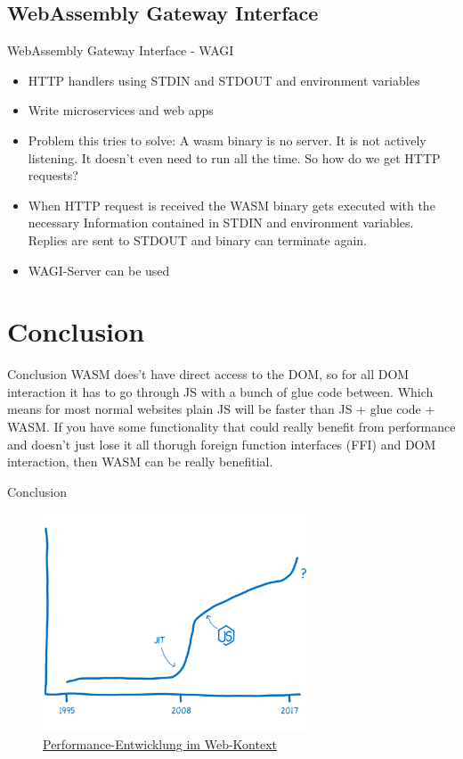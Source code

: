 \documentclass{beamer}
\begin{document}
\subsection{WebAssembly Gateway Interface}
\begin{frame}{WebAssembly Gateway Interface - WAGI}
    \begin{itemize}
        \item HTTP handlers using STDIN and STDOUT and environment variables
        \item Write microservices and web apps
        \item Problem this tries to solve: A wasm binary is no server. It is not actively listening. It doesn't even need to run all the time. So how do we get HTTP requests?
        \item When HTTP request is received the WASM binary gets executed with the necessary Information contained in STDIN and environment variables. Replies are sent to STDOUT and binary can terminate again.
        \item WAGI-Server can be used
    \end{itemize}
\end{frame}

\section{Conclusion}

\begin{frame}{Conclusion}
WASM does't have direct access to the DOM, so for all DOM interaction it has to go through JS with a bunch of glue code between. Which means for most normal websites plain JS will be faster than JS + glue code + WASM. If you have some functionality that could really benefit from performance and doesn't just lose it all thorugh foreign function interfaces (FFI) and DOM interaction, then WASM can be really benefitial.
\end{frame}

\begin{frame}{Conclusion}
    \begin{figure}
        \includegraphics[width=0.7\textwidth,height=0.7\textheight]{./images/perf_history.png}
        \caption{\href{https://hacks.mozilla.org/2017/02/a-cartoon-intro-to-webassembly/}{Performance-Entwicklung im Web-Kontext}}
    \end{figure}
\end{frame}
\end{document}
